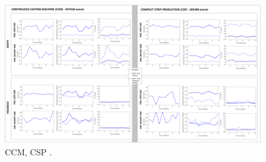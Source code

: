 \begin{landscape}
\begin{figure}[ht]
	\centering
	\hspace*{-1.3cm}
	\captionsetup{width=2\linewidth}
	\includegraphics[width=1.6\textwidth]{../images/supplements-CCM_CSP_real_life_events_analysis-results-curves_and_discrete_time.png}
	\caption{CCM, CSP \cc{} \ee{}.}
	\label{figure-supplements-CCM_CSP-curveplots_discrete}
\end{figure}
\end{landscape}